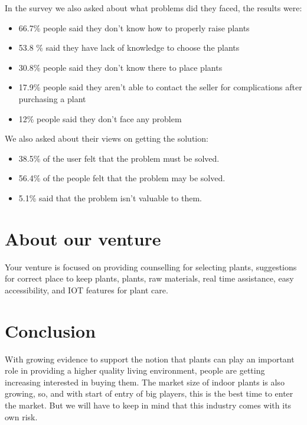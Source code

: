\documentclass{article}
\begin{document}
In the survey we also asked about what problems did they faced, the results were:

\begin{itemize}

\item 66.7\% people said they don't know how to properly raise plants

\item 53.8 \% said they have lack of knowledge to choose the plants

\item 30.8\% people said they don't know there to place plants

\item 17.9\% people said they aren't able to contact the seller for complications after purchasing a plant

\item 12\% people said they don't face any problem


\end{itemize}


We also asked about their views on getting the solution:

\begin{itemize}

\item 38.5\% of the user felt that the problem must be solved.
\item 56.4\% of the people felt that the problem may be solved.
\item 5.1\% said that the problem isn't valuable to them.

\end{itemize}

\section*{About our venture}

Your venture is focused on providing counselling for selecting plants, suggestions for correct place to keep plants, plants, raw materials, real time assistance, easy accessibility, and IOT features for plant care. 


\section*{Conclusion}

With growing evidence to support the notion that plants can play an important role in providing a higher quality living environment, people are getting increasing interested in buying them. The market size of indoor plants is also growing, so, and with start of entry of big players, this is the best time to enter the market. But we will have to keep in mind that this industry comes with its own risk.
\end{document}
